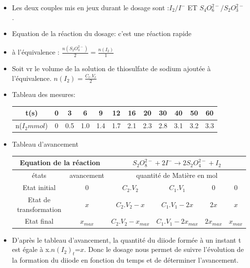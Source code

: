 \documentclass[12pt]{article}
\begin{document}
\begin{itemize}
\item Les deux couples mis en jeux durant le dosage sont :$I_2/I^-$ ET $S_4O_6^{2-}/S_2O_3^{2-}$.
\item Equation de la réaction du dosage: 
c'est une réaction rapide 
\item à l'équivalence : $\frac{n(S_2O_3^{2-})}{2} = \frac{n(I_2)}{1}$

\item Soit vr le volume de la solution de thiosulfate de sodium ajoutée à l'équivalence. $n(I_2) = \frac{C_r.V_r}{2}$

\item Tableau des mesures: 

\begin{center}
   \begin{tabular}{|c|c|c|c|c|c|c|c|c|c|c|c|}
	  \hline
	  t(s)         &0&3  &6&9&12&16&20&30&40&50&60 \\\hline
	  n($I_2 mmol$)&0&0.5&1.0 &1.4&1.7&2.1&2.3&2.8&3.1&3.2&3.3\\\hline
   \end{tabular}
\end{center}

\item Tableau d'avancement

\begin{tabular}{|c|c|c|c|c|c|}
    \hline
	\multicolumn{2}{|c|}{Equation de la réaction}& \multicolumn{4}{c|}{${ S_2O_8^{2-} + 2I^- \rightarrow 2S_2O_4^{2-} + I_2}$}\\\hline
    états  & avancement& \multicolumn{4}{|c|}{quantité de Matière en mol}\\\hline
    Etat initial          &    0        & $ C_2.V_2$   & $ C_1.V_1$  & $ 0$     & $ 0$ \\\hline
    Etat de transformation&    $x$      & $ C_2.V_2 - x$ & $ C_1.V_1 -  2x$      & $ 2x$        & $ x$ \\\hline
    Etat final            &    $x_{max}$& $  C_2.V_2 - x_{max}$ & $  C_1.V_1 - 2x_{max}$& $2x_{max}$  & $  x_{max}$ \\\hline
\end{tabular}

\item D'après le tableau d'avancement, la quantité du diiode formée à un instant t est égale à x.${n(I_2)}_t$=$x$. Donc le dosage nous permet de suivre l'évolution de la formation du diiode en fonction du temps et de déterminer l'avancement.


\end{itemize}
\end{document}
